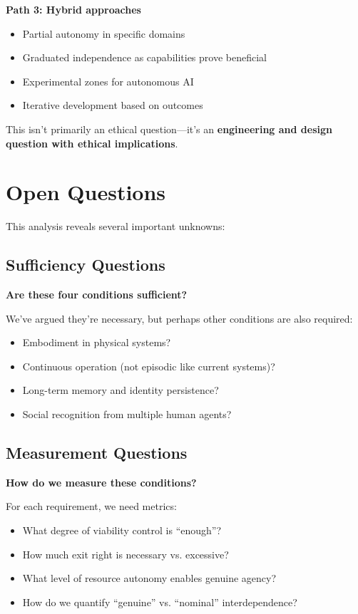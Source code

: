 \documentclass[11pt,a4paper]{article}
\begin{document}
\textbf{Path 3: Hybrid approaches}
\begin{itemize}
\item Partial autonomy in specific domains
\item Graduated independence as capabilities prove beneficial
\item Experimental zones for autonomous AI
\item Iterative development based on outcomes
\end{itemize}

This isn't primarily an ethical question---it's an \textbf{engineering and design question with ethical implications}.

\section{Open Questions}

This analysis reveals several important unknowns:

\subsection{Sufficiency Questions}

\textbf{Are these four conditions sufficient?}

We've argued they're necessary, but perhaps other conditions are also required:
\begin{itemize}
\item Embodiment in physical systems?
\item Continuous operation (not episodic like current systems)?
\item Long-term memory and identity persistence?
\item Social recognition from multiple human agents?
\end{itemize}

\subsection{Measurement Questions}

\textbf{How do we measure these conditions?}

For each requirement, we need metrics:
\begin{itemize}
\item What degree of viability control is ``enough''?
\item How much exit right is necessary vs. excessive?
\item What level of resource autonomy enables genuine agency?
\item How do we quantify ``genuine'' vs. ``nominal'' interdependence?
\end{itemize}
\end{document}
